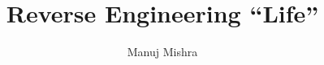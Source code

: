 \documentclass[a4paper, twoside, 10pt]{report}
\title{Reverse Engineering ``Life''}
\author{Manuj Mishra}
\begin{document}
\renewcommand{\listtheoremname}{List of Definitions}
\renewcommand{\vec}[1]{\underline{\mathbf{#1}}}
\newcommand{\round}[1]{\ensuremath{\lfloor#1\rceil}}



\begin{abstract}

\end{abstract}

\renewcommand{\abstractname}{Acknowledgements}

\begin{abstract}

\end{abstract}

\tableofcontents
\listoftodos
\listoffigures
\listoftheorems[ignoreall, show={definition}]
\begingroup
\let\clearpage\relax
\listofalgorithms
\endgroup









% 



\end{document}
